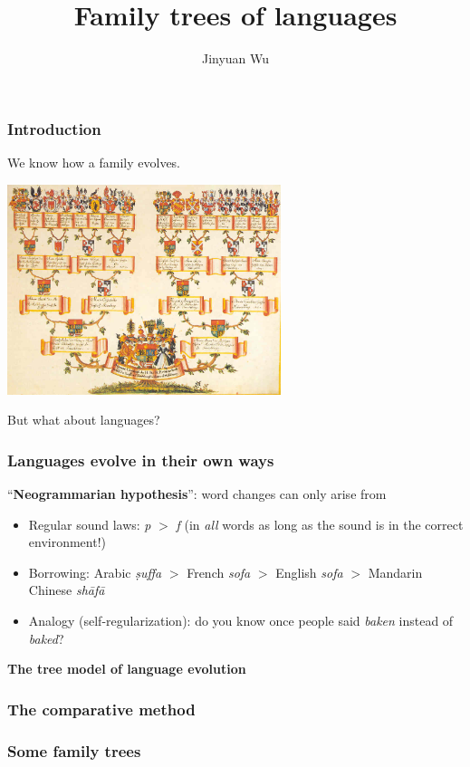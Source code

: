 \documentclass{beamer}
\title{Family trees of languages}
\author{Jinyuan Wu}
\newcommand{\corpus}[1]{\textit{#1}}
\begin{document}
\frame{\titlepage}

\begin{frame}
\frametitle{Introduction}

We know how a family evolves.

\begin{center}
    \includegraphics[width=0.6\textwidth]{photos/Waldburg-Ahnentafel.jpg}
\end{center} 

But what about languages?

\end{frame}

\begin{frame}
\frametitle{Languages evolve in their own ways}

``\textbf{Neogrammarian hypothesis}'':
word changes can only arise from
\begin{itemize}
    \item Regular sound laws: \corpus{p} $>$ \corpus{f} (in \emph{all} words as long as the sound is in the correct environment!)
    \item Borrowing: Arabic \corpus{ṣuffa} $>$ French \corpus{sofa} $>$ English \corpus{sofa} $>$ Mandarin Chinese \corpus{sh\={a}f\={a}} 
    \item Analogy (self-regularization): do you know once people said \corpus{baken} instead of \corpus{baked}?
\end{itemize}    

\textbf{The tree model of language evolution}

\end{frame}

\begin{frame}
\frametitle{The comparative method}

    

\end{frame}

\begin{frame}
\frametitle{Some family trees}

    

\end{frame}
\end{document}
